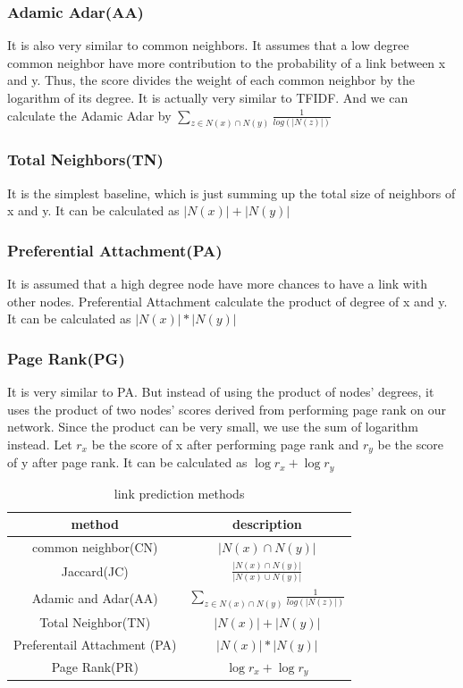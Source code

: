\documentclass[12pt]{article}
\begin{document}
\subsubsection{Adamic Adar(AA)}
It is also very similar to common neighbors. It assumes that a low degree common neighbor have more contribution to the probability of a link between x and y. Thus, the score divides the weight of each common neighbor by the logarithm of its degree. It is actually very similar to TFIDF. And we can calculate the Adamic Adar by $\sum_{z \in N(x) \cap N(y)}{\frac{1}{log(|N(z)|)}}$
\subsubsection{Total Neighbors(TN)}
It is the simplest baseline, which is just summing up the total size of neighbors of x and y. It can be calculated as $|N(x)| + |N(y)|$
\subsubsection{Preferential Attachment(PA)}
It is assumed that a high degree node have more chances to have a link with other nodes. Preferential Attachment calculate the product of degree of x and y. It can be calculated as $|N(x)| * |N(y)|$
\subsubsection{Page Rank(PG)}
It is very similar to PA. But instead of using the product of nodes' degrees, it uses the product of two nodes' scores derived from performing page rank on our network. Since the product can be very small, we use the sum of logarithm instead. Let $r_x$ be the score of x after performing page rank and $r_y$ be the score of y after page rank. It can be calculated as $\log{r_x} + \log{r_y}$
\begin{table}
	\begin{center}
		\begin{tabular}{|c|c|}
			\hline
			method & description \\
			\hline
			common neighbor(CN) & $|N(x) \cap N(y)|$ \\
			Jaccard(JC) & $\frac{|N(x) \cap N(y)|}{|N(x) \cup N(y)|}$ \\
			Adamic and Adar(AA) & $\sum_{z \in N(x) \cap N(y)}{\frac{1}{log(|N(z)|)}}$ \\
			Total Neighbor(TN) & $|N(x)| + |N(y)|$ \\
			Preferentail Attachment (PA) & $|N(x)| * |N(y)|$ \\
			Page Rank(PR)  & $\log{r_x} + \log{r_y}$ \\	
			\hline
		\end{tabular}
	\end{center}
\caption{link prediction methods}
\label{tab:method}
\end{table}
\end{document}
